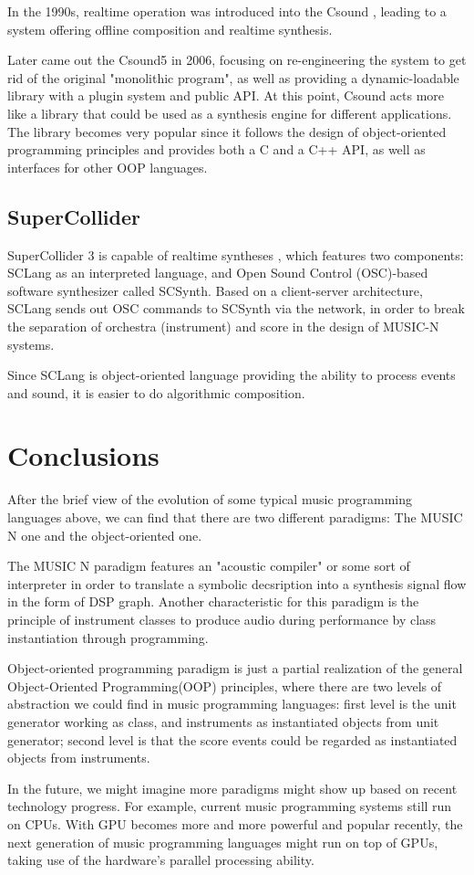\documentclass[jou]{apa6}
\begin{document}
In the 1990s, realtime operation was introduced into the Csound 
\parencite{vercoe1990real}, leading to a system offering
offline composition and realtime synthesis.

Later came out the Csound5 in 2006, focusing on re-engineering
the system to get rid of the original "monolithic program", as 
well as providing a dynamic-loadable library with a plugin 
system and public API. At this point, Csound acts more like a 
library that could be used as a synthesis engine for different
applications. The library becomes very popular since it follows
 the design of object-oriented 
programming principles and provides both a C and a C++ API, as 
well as interfaces for other OOP languages. 

\subsection{SuperCollider}

SuperCollider 3 is capable of realtime syntheses 
\parencite{mccartney2002rethinking}, which features two 
components: SCLang as an interpreted language, and
Open Sound Control (OSC)-based software synthesizer called 
SCSynth. Based on a client-server architecture, 
SCLang sends out OSC commands to SCSynth via 
the network, in order to break the separation of orchestra 
(instrument) and score in the design of MUSIC-N systems. 

Since SCLang is object-oriented language providing the 
ability to process events and sound, it is easier to
do algorithmic composition.

\section{Conclusions}

After the brief view of the evolution of some typical music 
programming languages above, we can find that there are two 
different paradigms: The MUSIC N one and the object-oriented one.

The MUSIC N paradigm features an "acoustic compiler" or some sort
of interpreter in order to translate a symbolic decsription into a 
synthesis signal flow in the form of DSP graph. Another characteristic 
for this paradigm is the principle of instrument classes to produce 
audio during performance by class instantiation through programming.

Object-oriented programming paradigm is just 
a partial realization of the general Object-Oriented Programming(OOP) 
principles, where there are two levels of abstraction we could find
in music programming languages: first level is 
the unit generator working as class, and instruments as instantiated 
objects from unit generator; second level is that the score events 
could be regarded as instantiated objects from instruments.

In the future, we might imagine more paradigms might show up based
on recent technology progress. For example, current music programming
systems still run on CPUs. With GPU becomes more and more powerful and 
popular recently, the next generation of music programming languages might
run on top of GPUs, taking use of the hardware's parallel processing 
ability.

\printbibliography
\end{document}
